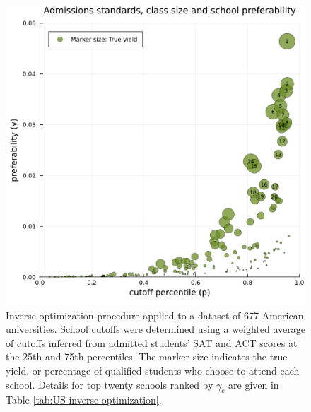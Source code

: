 \documentclass[12pt]{article}
\theoremstyle{definition}
\begin{document}
\begin{figure}
\begin{center}\includegraphics[width=\linewidth, ]{plots/US-cutoff-gamma.pdf}\end{center}
\captionsetup{singlelinecheck=off}
    \caption[.]{Inverse optimization procedure applied to a dataset of 677 American universities. School cutoffs were determined using a weighted average of cutoffs inferred from admitted students' SAT and ACT scores at the 25th and 75th percentiles. The marker size indicates the true yield, or percentage of qualified students who choose to attend each school. Details for top twenty schools ranked by $\gamma_c$ are given in Table \ref{tab:US-inverse-optimization}.}
\label{US-cutoff-gamma}
\end{figure}
\end{document}
